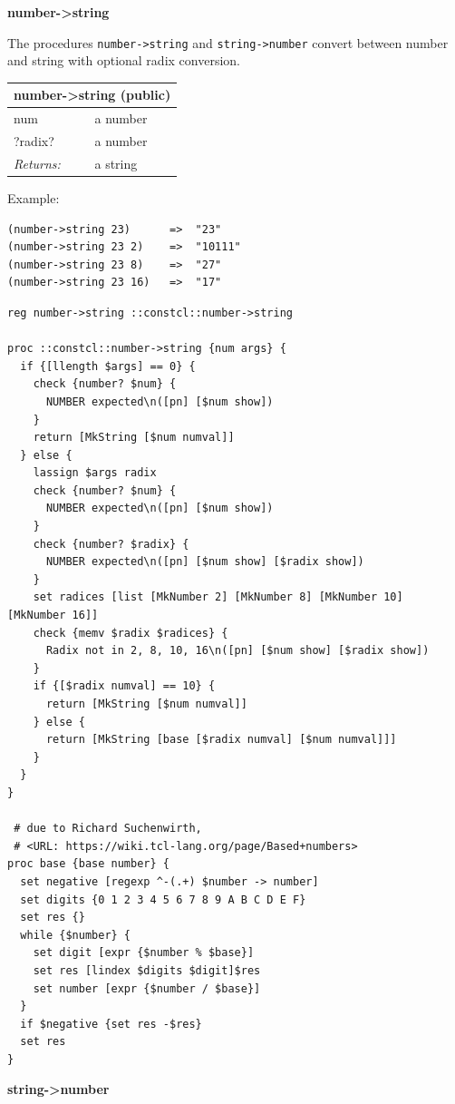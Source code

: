 \documentclass[twoside,9pt]{report}
\begin{document}
\textbf{number->string}


The procedures \texttt{number->string} and \texttt{string->number} convert between number and string with optional radix conversion.

\begin{tabular}{ |l l| }
\hline
\multicolumn{2}{|l|}{number->string (public)} \\
\hline
num & a number \\
?radix? & a number \\
\textit{Returns:} & a string \\
\hline
\end{tabular}


Example:

\noindent\makebox[\linewidth]{\rule{\linewidth}{0.4pt}}
\begin{lstlisting}
(number->string 23)      =>  "23"
(number->string 23 2)    =>  "10111"
(number->string 23 8)    =>  "27"
(number->string 23 16)   =>  "17"
\end{lstlisting}
\noindent\makebox[\linewidth]{\rule{\linewidth}{0.4pt}}
\noindent\makebox[\linewidth]{\rule{\linewidth}{0.4pt}}
\begin{lstlisting}
reg number->string ::constcl::number->string
 
proc ::constcl::number->string {num args} {
  if {[llength $args] == 0} {
    check {number? $num} {
      NUMBER expected\n([pn] [$num show])
    }
    return [MkString [$num numval]]
  } else {
    lassign $args radix
    check {number? $num} {
      NUMBER expected\n([pn] [$num show])
    }
    check {number? $radix} {
      NUMBER expected\n([pn] [$num show] [$radix show])
    }
    set radices [list [MkNumber 2] [MkNumber 8] [MkNumber 10] [MkNumber 16]]
    check {memv $radix $radices} {
      Radix not in 2, 8, 10, 16\n([pn] [$num show] [$radix show])
    }
    if {[$radix numval] == 10} {
      return [MkString [$num numval]]
    } else {
      return [MkString [base [$radix numval] [$num numval]]]
    }
  }
}
 
 # due to Richard Suchenwirth,
 # <URL: https://wiki.tcl-lang.org/page/Based+numbers>
proc base {base number} {
  set negative [regexp ^-(.+) $number -> number]
  set digits {0 1 2 3 4 5 6 7 8 9 A B C D E F}
  set res {}
  while {$number} {
    set digit [expr {$number % $base}]
    set res [lindex $digits $digit]$res
    set number [expr {$number / $base}]
  }
  if $negative {set res -$res}
  set res
}
\end{lstlisting}
\noindent\makebox[\linewidth]{\rule{\linewidth}{0.4pt}}

\textbf{string->number}
\end{document}
